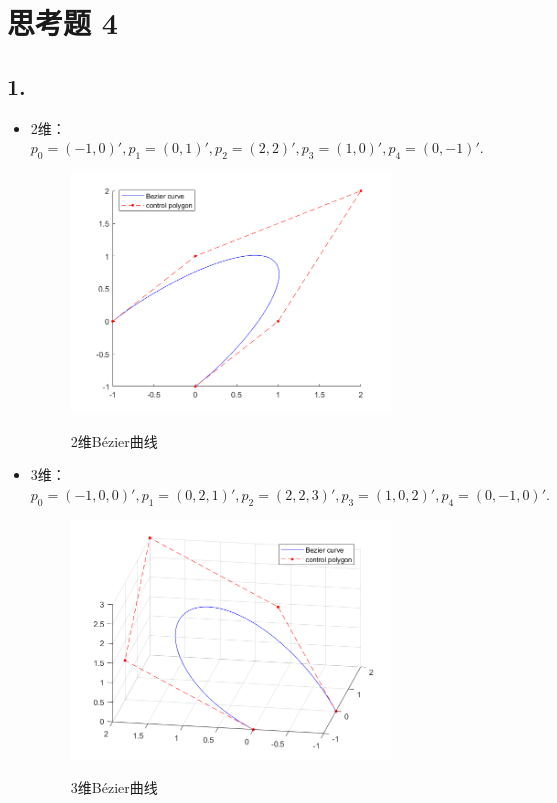 \documentclass[utf8]{ctexart}
\begin{document}
\section*{思考题 4}
\subsection*{1.}
\begin{itemize}
    \item 2维：$p_0 = (-1,0)',
    p_1 = (0,1)',
    p_2 = (2,2)',
    p_3 = (1,0)',
    p_4 = (0,-1)'.$

    \begin{figure}[H]
        \centering
        \includegraphics[width=0.8\textwidth]{bezier_2d.png}
        \label{fig1}
        \caption{2维Bézier曲线}
    \end{figure}

    \item 3维：$p_0 = (-1,0,0)',
    p_1 = (0,2,1)',
    p_2 = (2,2,3)',
    p_3 = (1,0,2)',
    p_4 = (0,-1,0)'.$
    \begin{figure}[H]
        \centering
        \includegraphics[width=0.8\textwidth]{bezier_3d.png}
        \label{fig2}
        \caption{3维Bézier曲线}
    \end{figure}
\end{itemize}
\end{document}
